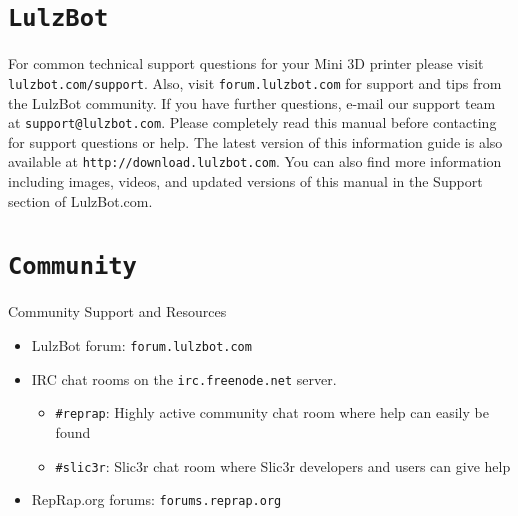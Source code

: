 %
%
%
%
%

\section{\texttt{LulzBot}}
\setlength{\parindent}{0pt}
For common technical support questions for your Mini 3D printer please visit \texttt{lulzbot.com/support}. Also, visit \texttt{forum.lulzbot.com} for support and tips from the LulzBot community. If you have further questions, e-mail our support team at \texttt{support@lulzbot.com}. Please completely read this manual before contacting for support questions or help. The latest version of this information guide is also available at \texttt{http://download.lulzbot.com}. You can also find more information including images, videos, and updated versions of this manual in the Support section of LulzBot.com.

\section{\texttt{Community}}
Community Support and Resources

\begin{itemize}

\item LulzBot forum: \texttt{forum.lulzbot.com}
\item IRC chat rooms on the \texttt{irc.freenode.net} server.
	\begin{itemize}
	\item \texttt{\#reprap}: Highly active community chat room where help can easily be found
	\item \texttt{\#slic3r}: Slic3r chat room where Slic3r developers and users can give help
	\end{itemize}
\item RepRap.org forums: \texttt{forums.reprap.org}

\end{itemize}
